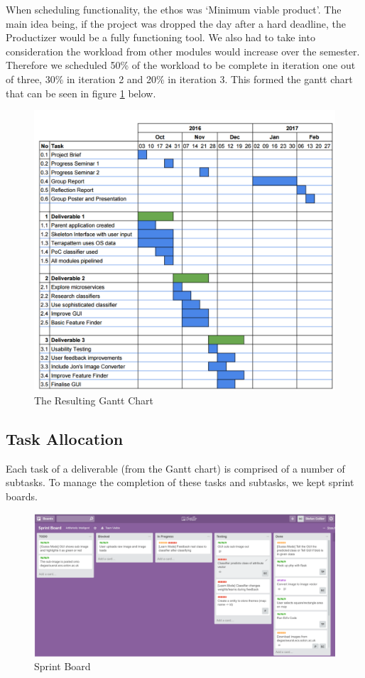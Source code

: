 When scheduling functionality, the ethos was `Minimum viable product'. The main idea being, if the project was dropped the day after a hard deadline, the Productizer would be a fully functioning tool. We also had to take into consideration the workload from other modules would increase over the semester. Therefore we scheduled 50\% of the workload to be complete in iteration one out of three, 30\% in iteration 2 and 20\% in iteration 3. This formed the gantt chart that can be seen in figure \ref{fig:gantt} below. 

\begin{figure}[H]
    \centering
    \includegraphics[width=1.1\textwidth]{figs/3/gantt}
    \caption{The Resulting Gantt Chart}
    \label{fig:gantt}
\end{figure}

\newpage

\subsection{Task Allocation}
Each task of a deliverable (from the Gantt chart) is comprised of a number of subtasks. To manage the completion of these tasks and subtasks, we kept sprint boards. 

\begin{figure}
    \centering
    \includegraphics{figs/3/sprint_board}
    \caption{Sprint Board}
    \label{fig:sprint}
\end{figure}

